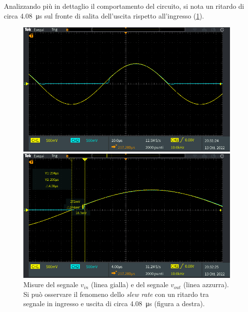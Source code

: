 \noindent
Analizzando più in dettaglio il comportamento del circuito, si nota un ritardo di circa \SI{4.08}{\micro\second} sul fronte di salita dell'uscita rispetto all'ingresso (\Fig\ref{fig:slewrate}).
\begin{figure}[!h]
	\centering
	\begin{minipage}{.496\textwidth}
		\includegraphics[width=\linewidth]{./ImageFiles/Laboratorio 2/TEK00038.PNG}
	\end{minipage}
	\begin{minipage}{.496\textwidth}
		\includegraphics[width=\linewidth]{./ImageFiles/Laboratorio 2/TEK00039.PNG}
	\end{minipage}
	\caption{Misure del segnale $v_{in}$ (linea gialla) e del segnale $v_{out}$ (linea azzurra). Si può osservare il fenomeno dello \textit{slew rate} con un ritardo tra segnale in ingresso e uscita di circa \SI{4.08}{\micro\second} (figura a destra).}
	\label{fig:slewrate}
\end{figure}
